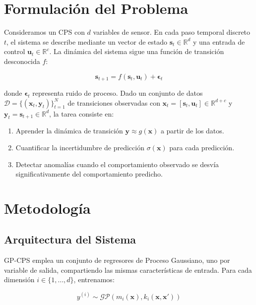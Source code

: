 \documentclass[conference]{IEEEtran}
\begin{document}
\section{Formulación del Problema}
\label{sec:problema}

Consideramos un CPS con $d$ variables de sensor. En cada paso temporal discreto $t$, el sistema se describe mediante un vector de estado $\mathbf{s}_t \in \mathbb{R}^d$ y una entrada de control $\mathbf{u}_t \in \mathbb{R}^c$. La dinámica del sistema sigue una función de transición desconocida $f$:

\begin{equation}
\mathbf{s}_{t+1} = f(\mathbf{s}_t, \mathbf{u}_t) + \boldsymbol{\epsilon}_t
\label{eq:dinamica}
\end{equation}

donde $\boldsymbol{\epsilon}_t$ representa ruido de proceso. Dado un conjunto de datos $\mathcal{D} = \{(\mathbf{x}_t, \mathbf{y}_t)\}_{t=1}^N$ de transiciones observadas con $\mathbf{x}_t = [\mathbf{s}_t, \mathbf{u}_t] \in \mathbb{R}^{d+c}$ y $\mathbf{y}_t = \mathbf{s}_{t+1} \in \mathbb{R}^d$, la tarea consiste en:

\begin{enumerate}
\item Aprender la dinámica de transición $\mathbf{y} \approx g(\mathbf{x})$ a partir de los datos.
\item Cuantificar la incertidumbre de predicción $\sigma(\mathbf{x})$ para cada predicción.
\item Detectar anomalías cuando el comportamiento observado se desvía significativamente del comportamiento predicho.
\end{enumerate}

\section{Metodología}
\label{sec:metodo}

\subsection{Arquitectura del Sistema}
GP-CPS emplea un conjunto de regresores de Proceso Gaussiano, uno por variable de salida, compartiendo las mismas características de entrada. Para cada dimensión $i \in \{1, \dots, d\}$, entrenamos:

\begin{equation}
y^{(i)} \sim \mathcal{GP}\left(m_i(\mathbf{x}), k_i(\mathbf{x}, \mathbf{x}')\right)
\label{eq:gp}
\end{equation}
\end{document}
